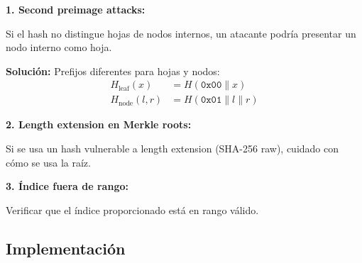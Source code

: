 \documentclass[11pt,a4paper,twoside,openright]{book}
\theoremstyle{definition}
\theoremstyle{plain}
\theoremstyle{remark}
\begin{document}
\begin{advertencia}
\textbf{1. Second preimage attacks:}

Si el hash no distingue hojas de nodos internos, un atacante podría presentar un nodo interno como hoja.

\textbf{Solución:} Prefijos diferentes para hojas y nodos:
\begin{align}
H_{\text{leaf}}(x) &= H(\texttt{0x00} \| x) \\
H_{\text{node}}(l, r) &= H(\texttt{0x01} \| l \| r)
\end{align}

\textbf{2. Length extension en Merkle roots:}

Si se usa un hash vulnerable a length extension (SHA-256 raw), cuidado con cómo se usa la raíz.

\textbf{3. Índice fuera de rango:}

Verificar que el índice proporcionado está en rango válido.
\end{advertencia}

\subsection{Implementación}
\end{document}

